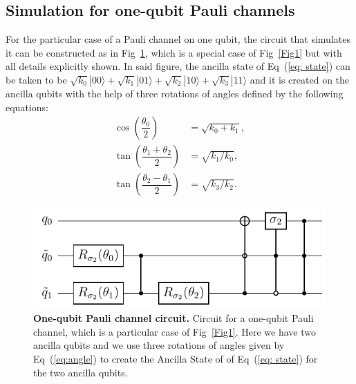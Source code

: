 \documentclass[10pt,letterpaper]{article} %
\newcommand{\fref}[1]{Fig~\ref{#1}}
\newcommand{\eref}[1]{Eq~(\ref{#1})}
\begin{document}
\subsection{Simulation for one-qubit Pauli channels} %
\label{subsec: Simulation for one-qubit Pauli channels}

For the particular case of a Pauli channel on one qubit, the circuit that
simulates it can be constructed as in \fref{Fig2},
which is a special case of \fref{Fig1}
but with all details  explicitly shown.
In said figure, the ancilla state
of \eref{eq: state} can be taken to be
$\sqrt{k_{0}} |00\rangle + \sqrt{k_{1}} |01\rangle + \sqrt{k_{2}} 
|10\rangle + \sqrt{k_{3}}|11\rangle$
and it is created on the ancilla qubits with the help of three rotations of angles
defined by the following equations:
\begin{align}
\label{eq:angle}
\cos\left(\dfrac{\theta_0}{2} \right) &= \sqrt{k_{0} + k_{1}},\nonumber \\
\tan\left( \dfrac{\theta_1 + \theta_2}{2} \right) &= \sqrt{k_{1}/k_{0}},  \\
\tan\left( \dfrac{\theta_2 - \theta_1}{2} \right) &= \sqrt{k_{3}/k_{2}}.  \nonumber
\end{align}

\begin{figure} %
\centering
\includegraphics{circuito_unqubit.pdf}
\caption{
{\bf One-qubit Pauli channel circuit.} Circuit for a one-qubit Pauli channel,
which is a particular case of \fref{Fig1}.  Here we have two
ancilla qubits and we use three rotations
of angles given by \eref{eq:angle} to create the Ancilla State of
of \eref{eq: state} for the two ancilla qubits.
}
\label{Fig2} 
\end{figure} %


\end{document}
